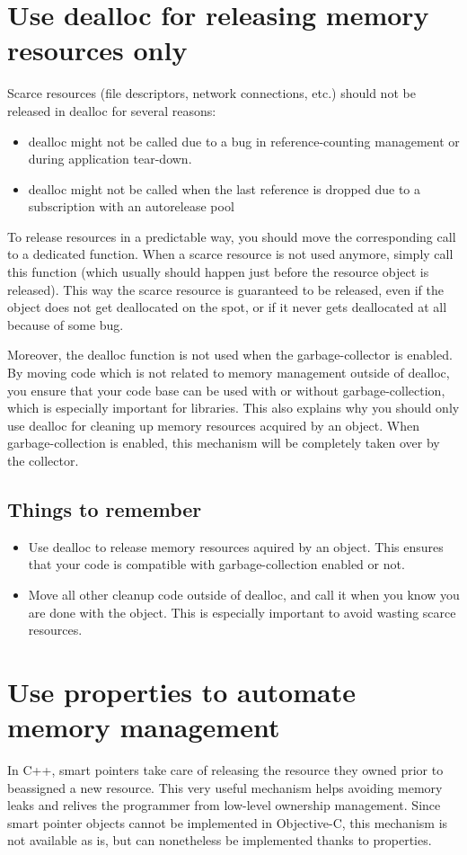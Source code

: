 \section{Use dealloc for releasing memory resources only}
Scarce resources (file descriptors, network connections, etc.) should not be released in dealloc for several reasons:
\begin{itemize}
\item dealloc might not be called due to a bug in reference-counting management or during application tear-down.
\item dealloc might not be called when the last reference is dropped due to a subscription with an autorelease pool
\end{itemize}
To release resources in a predictable way, you should move the corresponding call to a dedicated function. When a scarce resource is not used anymore, simply call this function (which usually should happen just before the resource object is released). This way the scarce resource is guaranteed to be released, even if the object does not get deallocated on the spot, or if it never gets deallocated at all because of some bug.

Moreover, the dealloc function is not used when the garbage-collector is enabled. By moving code which is not related to memory management outside of dealloc, you ensure that your code base can be used with or without garbage-collection, which is especially important for libraries. This also explains why you should only use dealloc for cleaning up memory resources acquired by an object. When garbage-collection is enabled, this mechanism will be completely taken over by the collector.

\subsection{Things to remember}
\begin{itemize}
\item Use dealloc to release memory resources aquired by an object. This ensures that your code is compatible with garbage-collection enabled or not.
\item Move all other cleanup code outside of dealloc, and call it when you know you are done with the object. This is especially important to avoid wasting scarce resources.
\end{itemize}

\section{Use properties to automate memory management}
In C++, smart pointers take care of releasing the resource they owned prior to beassigned a new resource. This very useful mechanism helps avoiding memory leaks and relives the programmer from low-level ownership management. Since smart pointer objects cannot be implemented in Objective-C, this mechanism is not available as is, but can nonetheless be implemented thanks to properties.

